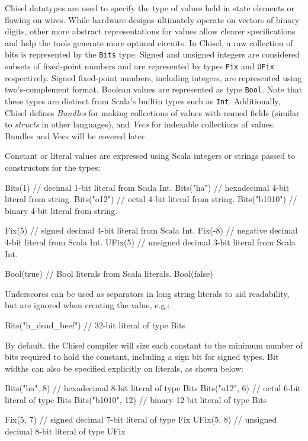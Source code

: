 \documentclass[10pt]{article}
\def\code#1{{\tt #1}}
\begin{document}
Chisel datatypes are used to specify the type of values held in state
elements or flowing on wires.  While hardware designs ultimately
operate on vectors of binary digits, other more abstract
representations for values allow clearer specifications and help the
tools generate more optimal circuits.  In Chisel, a raw collection of
bits is represented by the \code{Bits} type.  Signed and unsigned integers
are considered subsets of fixed-point numbers and are represented by
types \code{Fix} and \code{UFix} respectively. Signed fixed-point
numbers, including integers, are represented using two's-complement
format.  Boolean values are represented as type \code{Bool}.  Note
that these types are distinct from Scala's builtin types such as
\code{Int}.  Additionally, Chisel defines {\em Bundles} for making
collections of values with named fields (similar to {\em structs} in
other languages), and {\em Vecs} for indexable collections of
values.  Bundles and Vecs will be covered later.

Constant or literal values are expressed using Scala integers or
strings passed to constructors for the types:
\begin{scala}
Bits(1)       // decimal 1-bit literal from Scala Int.
Bits("ha")    // hexadecimal 4-bit literal from string.
Bits("o12")   // octal 4-bit literal from string.
Bits("b1010") // binary 4-bit literal from string.

Fix(5)        // signed decimal 4-bit literal from Scala Int.
Fix(-8)       // negative decimal 4-bit literal from Scala Int.
UFix(5)       // unsigned decimal 3-bit literal from Scala Int.

Bool(true)    // Bool literals from Scala literals.
Bool(false)
\end{scala}

Underscores can be used as separators in long string literals to aid
readability, but are ignored when creating the value, e.g.:
\begin{scala}
Bits("h_dead_beef")   // 32-bit literal of type Bits
\end{scala}

By default, the Chisel compiler will size each constant to the minimum
number of bits required to hold the constant, including a sign bit for
signed types.  Bit widths can also be specified explicitly on
literals, as shown below:
\begin{scala}
Bits("ha", 8)     // hexadecimal 8-bit literal of type Bits
Bits("o12", 6)    // octal 6-bit literal of type Bits
Bits("b1010", 12) // binary 12-bit literal of type Bits

Fix(5, 7)         // signed decimal 7-bit literal of type Fix
UFix(5, 8)        // unsigned decimal 8-bit literal of type UFix
\end{scala}
\end{document}
